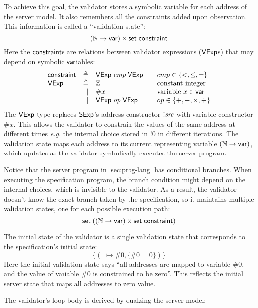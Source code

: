 To achieve this goal, the validator stores a symbolic variable for each address
of the server model.  It also remembers all the constraints added upon
observation.  This information is called a ``validation state'':
\[(\mathbb N\to\mathsf{var})\times\mathsf{set}\;\mathsf{constraint}\]
Here the $\mathsf{constraint}$s are relations between validator expressions ($\mathsf{VExp}$s)
that may depend on symbolic $\mathsf{var}$iables:
\[\begin{array}{lrl@{\qquad}l}
\constraint&\triangleq&\Vexp\ccmp\Vexp&cmp\in\{<,\le,=\}\\
\Vexp&\triangleq&\Int&\text{constant integer}\\
&\mid&\#x&\text{variable }x\in\Var\\
&\mid&\Vexp\oop\Vexp&op\in\{+,-,\times,\div\}\\
\end{array}\]
The $\mathsf{VExp}$ type replaces $\mathsf{SExp}$'s address constructor $!\mathit{src}$ with variable
constructor $\#x$.  This allows the validator to constrain the values of the
same address at different times {\it e.g.} the internal choice stored in $!0$ in
different iterations.  The validation state maps each address to its current
representing variable $(\mathbb N\to\mathsf{var})$, which updates as the validator
symbolically executes the server program.

Notice that the server program in \autoref{sec:prog-lang} has conditional
branches.  When executing the specification program, the branch condition might
depend on the internal choices, which is invisible to the validator.  As a
result, the validator doesn't know the exact branch taken by the specification,
so it maintains multiple validation states, one for each possible execution
path:
\[\mathsf{set}\;((\mathbb N\to\mathsf{var})\times\mathsf{set}\;\mathsf{constraint})\]

The initial state of the validator is a single validation state that corresponds
to the specification's initial state:
\[\{(\_\mapsto\#0,\{\#0=0\})\}\]
Here the initial validation state says ``all addresses are mapped to variable
$\#0$, and the value of variable $\#0$ is constrained to be zero''.  This
reflects the initial server state that maps all addresses to zero value.

The validator's loop body is derived by dualzing the server model:

